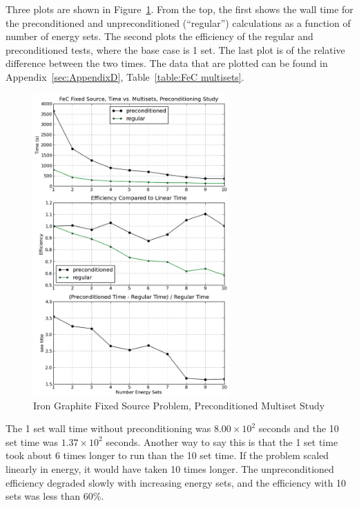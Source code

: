 Three plots are shown in Figure~\ref{fig:FeC multisets}. From the top, the first shows the wall time for the preconditioned and unpreconditioned (``regular'') calculations as a function of number of energy sets. The second plots the efficiency of the regular and preconditioned tests, where the base case is 1 set. The last plot is of the relative difference between the two times. The data that are plotted can be found in Appendix~\ref{sec:AppendixD}, Table~\ref{table:FeC multisets}.
%
\begin{figure}[!ht]
    \begin{center}
      \includegraphics [width=0.67\textwidth, height=0.85\textheight] {FeCmultisets}
   \end{center}
   \caption{Iron Graphite Fixed Source Problem, Preconditioned Multiset Study}
   \label{fig:FeC multisets}
\end{figure}

The 1 set wall time without preconditioning was $8.00 \times 10^{2}$ seconds and the 10 set time was $1.37 \times 10^{2}$ seconds. Another way to say this is that the 1 set time took about 6 times longer to run than the 10 set time. If the problem scaled linearly in energy, it would have taken 10 times longer. The unpreconditioned efficiency degraded slowly with increasing energy sets, and the efficiency with 10 sets was less than 60\%.

